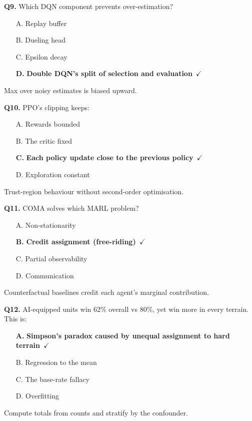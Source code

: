 \documentclass[11pt]{article}
\begin{document}
{\noindent\textbf{Q9.} Which DQN component prevents over-estimation?\begin{itemize}[leftmargin=2.2em,itemsep=0pt,topsep=1pt]\item[A.] Replay buffer\item[B.] Dueling head\item[C.] Epsilon decay\item[\textbf{D.}] \textbf{Double DQN's split of selection and evaluation}~{\color{GrnN}$\checkmark$}\end{itemize} Max over noisy estimates is biased upward.\par\medskip

\noindent\textbf{Q10.} PPO's clipping keeps:\begin{itemize}[leftmargin=2.2em,itemsep=0pt,topsep=1pt]\item[A.] Rewards bounded\item[B.] The critic fixed\item[\textbf{C.}] \textbf{Each policy update close to the previous policy}~{\color{GrnN}$\checkmark$}\item[D.] Exploration constant\end{itemize} Trust-region behaviour without second-order optimisation.\par\medskip

\noindent\textbf{Q11.} COMA solves which MARL problem?\begin{itemize}[leftmargin=2.2em,itemsep=0pt,topsep=1pt]\item[A.] Non-stationarity\item[\textbf{B.}] \textbf{Credit assignment (free-riding)}~{\color{GrnN}$\checkmark$}\item[C.] Partial observability\item[D.] Communication\end{itemize} Counterfactual baselines credit each agent's marginal contribution.\par\medskip

\noindent\textbf{Q12.} AI-equipped units win 62\% overall vs 80\%, yet win more in every terrain. This is:\begin{itemize}[leftmargin=2.2em,itemsep=0pt,topsep=1pt]\item[\textbf{A.}] \textbf{Simpson's paradox caused by unequal assignment to hard terrain}~{\color{GrnN}$\checkmark$}\item[B.] Regression to the mean\item[C.] The base-rate fallacy\item[D.] Overfitting\end{itemize} Compute totals from counts and stratify by the confounder.\par\medskip

}
\end{document}
